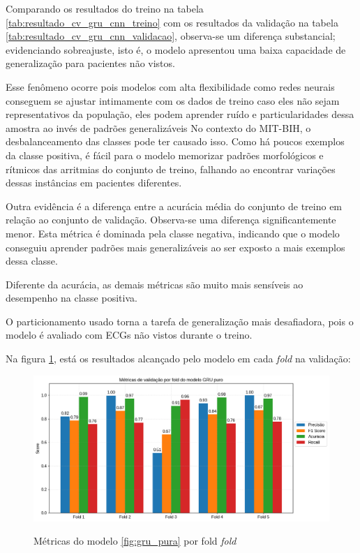 Comparando os resultados do treino na tabela \ref{tab:resultado_cv_gru_cnn_treino} com os resultados da validação na tabela \ref{tab:resultado_cv_gru_cnn_validacao},
observa-se um diferença substancial; evidenciando sobreajuste, isto é, o modelo apresentou uma baixa capacidade de generalização para pacientes não vistos.

Esse fenômeno ocorre pois modelos com alta flexibilidade como redes neurais conseguem se ajustar intimamente com os dados de treino
caso eles não sejam representativos da população, eles podem aprender ruído e particularidades dessa amostra ao invés de padrões generalizáveis
No contexto do MIT-BIH, o desbalanceamento das classes pode ter causado isso. Como há poucos exemplos da classe positiva, é fácil para o modelo memorizar
padrões morfológicos e rítmicos das arritmias do conjunto de treino, falhando ao encontrar variações dessas instâncias em pacientes diferentes.

Outra evidência é a diferença entre a acurácia média do conjunto de treino em relação ao conjunto de validação. Observa-se uma 
diferença significantemente menor. Esta métrica é dominada pela classe negativa, indicando que o modelo conseguiu aprender padrões mais generalizáveis
ao ser exposto a mais exemplos dessa classe. 

Diferente da acurácia, as demais métricas são muito mais sensíveis ao desempenho na classe positiva.

O particionamento usado torna a tarefa de generalização mais desafiadora, pois o modelo é avaliado com ECGs não vistos
durante o treino.

Na figura \ref{fig:gru_resultados_por_fold}, está os resultados alcançado pelo modelo em cada \textit{fold} na validação:

\begin{figure}[H]
  \centering
  \caption{Métricas do modelo \ref{fig:gru_pura} por fold \textit{fold}}
   \includegraphics[width=1.0\textwidth]{figuras/modelos_resultados/gru/gru_metricas_por_fold.png} %
  \label{fig:gru_resultados_por_fold}
\end{figure}

